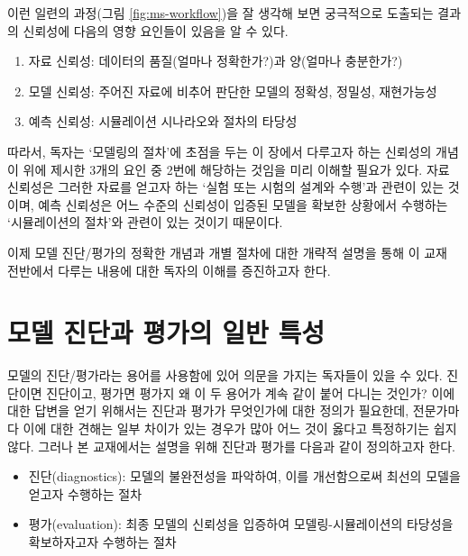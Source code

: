 \documentclass[
  10pt,
  krantz2,
  a4paper]{krantz}
\providecommand{\tightlist}{%
  \setlength{\itemsep}{0pt}\setlength{\parskip}{0pt}}
\theoremstyle{definition}
\theoremstyle{definition}
\theoremstyle{definition}
\theoremstyle{remark}
\begin{document}
이런 일련의 과정(그림 \ref{fig:ms-workflow})을 잘 생각해 보면 궁극적으로 도출되는 결과의 신뢰성에 다음의 영향 요인들이 있음을 알 수 있다.

\begin{enumerate}
\def\labelenumi{\arabic{enumi}.}
\tightlist
\item
  자료 신뢰성: 데이터의 품질(얼마나 정확한가?)과 양(얼마나 충분한가?)
\item
  모델 신뢰성: 주어진 자료에 비추어 판단한 모델의 정확성, 정밀성, 재현가능성
\item
  예측 신뢰성: 시뮬레이션 시나라오와 절차의 타당성
\end{enumerate}

따라서, 독자는 `모델링의 절차'에 초점을 두는 이 장에서 다루고자 하는 신뢰성의 개념이 위에 제시한 3개의 요인 중 2번에 해당하는 것임을 미리 이해할 필요가 있다. 자료 신뢰성은 그러한 자료를 얻고자 하는 `실험 또는 시험의 설계와 수행'과 관련이 있는 것이며, 예측 신뢰성은 어느 수준의 신뢰성이 입증된 모델을 확보한 상황에서 수행하는 `시뮬레이션의 절차'와 관련이 있는 것이기 때문이다.

이제 모델 진단/평가의 정확한 개념과 개별 절차에 대한 개략적 설명을 통해 이 교재 전반에서 다루는 내용에 대한 독자의 이해를 증진하고자 한다.

\hypertarget{uxbaa8uxb378-uxc9c4uxb2e8uxacfc-uxd3c9uxac00uxc758-uxc77cuxbc18-uxd2b9uxc131}{%
\section{모델 진단과 평가의 일반 특성}\label{uxbaa8uxb378-uxc9c4uxb2e8uxacfc-uxd3c9uxac00uxc758-uxc77cuxbc18-uxd2b9uxc131}}

모델의 진단/평가라는 용어를 사용함에 있어 의문을 가지는 독자들이 있을 수 있다. 진단이면 진단이고, 평가면 평가지 왜 이 두 용어가 계속 같이 붙어 다니는 것인가? 이에 대한 답변을 얻기 위해서는 진단과 평가가 무엇인가에 대한 정의가 필요한데, 전문가마다 이에 대한 견해는 일부 차이가 있는 경우가 많아 어느 것이 옳다고 특정하기는 쉽지 않다. 그러나 본 교재에서는 설명을 위해 진단과 평가를 다음과 같이 정의하고자 한다.

\begin{itemize}
\tightlist
\item
  진단(diagnostics): 모델의 불완전성을 파악하여, 이를 개선함으로써 최선의 모델을 얻고자 수행하는 절차
\item
  평가(evaluation): 최종 모델의 신뢰성을 입증하여 모델링-시뮬레이션의 타당성을 확보하자고자 수행하는 절차
\end{itemize}
\end{document}
